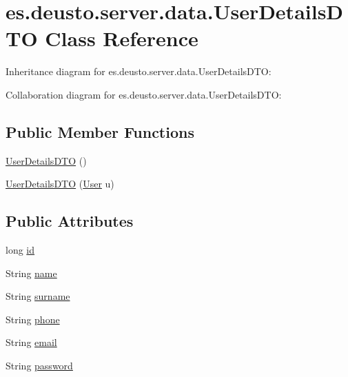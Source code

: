 \hypertarget{classes_1_1deusto_1_1server_1_1data_1_1_user_details_d_t_o}{}\section{es.\+deusto.\+server.\+data.\+User\+Details\+D\+TO Class Reference}
\label{classes_1_1deusto_1_1server_1_1data_1_1_user_details_d_t_o}


Inheritance diagram for es.\+deusto.\+server.\+data.\+User\+Details\+D\+TO\+:


Collaboration diagram for es.\+deusto.\+server.\+data.\+User\+Details\+D\+TO\+:
\subsection*{Public Member Functions}
\begin{DoxyCompactItemize}
\item 
\mbox{\hyperlink{classes_1_1deusto_1_1server_1_1data_1_1_user_details_d_t_o_ac079ed52a730b1c55f989bfd41f51ddb}{User\+Details\+D\+TO}} ()
\item 
\mbox{\hyperlink{classes_1_1deusto_1_1server_1_1data_1_1_user_details_d_t_o_aae05e33019f1da5126c95feda9f7d25a}{User\+Details\+D\+TO}} (\mbox{\hyperlink{classes_1_1deusto_1_1server_1_1jdo_1_1_user}{User}} u)
\end{DoxyCompactItemize}
\subsection*{Public Attributes}
\begin{DoxyCompactItemize}
\item 
long \mbox{\hyperlink{classes_1_1deusto_1_1server_1_1data_1_1_user_details_d_t_o_a5f54dc128e6dc54bcd889e220d2b635e}{id}}
\item 
String \mbox{\hyperlink{classes_1_1deusto_1_1server_1_1data_1_1_user_details_d_t_o_a5ed08eaa3f11b469cec38f4e00b1d770}{name}}
\item 
String \mbox{\hyperlink{classes_1_1deusto_1_1server_1_1data_1_1_user_details_d_t_o_a330072900fcfa1074bfd830396b42fd3}{surname}}
\item 
String \mbox{\hyperlink{classes_1_1deusto_1_1server_1_1data_1_1_user_details_d_t_o_a02645a69a61019b6ef72367320d6c2ca}{phone}}
\item 
String \mbox{\hyperlink{classes_1_1deusto_1_1server_1_1data_1_1_user_details_d_t_o_a669506e7fff75d8d85e335629441e1c6}{email}}
\item 
String \mbox{\hyperlink{classes_1_1deusto_1_1server_1_1data_1_1_user_details_d_t_o_a98c10832def6c14ba125dd9191789658}{password}}
\end{DoxyCompactItemize}


